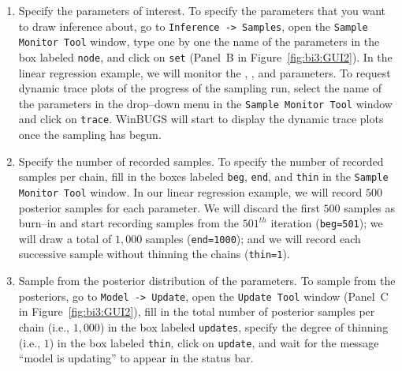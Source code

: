 \begin{enumerate}
\item Specify the parameters of interest. To specify the parameters that you want to draw inference about, go to \texttt{Inference -> Samples}, open the \texttt{Sample Monitor Tool} window, type one by one the name of the parameters in the box labeled \texttt{node}, and click on \texttt{set} (Panel~B in Figure~\ref{fig:bi3:GUI2}). In the linear regression example, we will monitor the , , and  parameters. To request dynamic trace plots of the progress of the sampling run, select the name of the parameters in the drop--down menu in the \texttt{Sample Monitor Tool} window and click on \texttt{trace}. WinBUGS will start to display the dynamic trace plots once the sampling has begun. 

\item Specify the number of recorded samples. To specify the number of recorded samples per chain, fill in the boxes labeled \texttt{beg}, \texttt{end}, and \texttt{thin} in the \texttt{Sample Monitor Tool} window. In our linear regression example, we will record $500$ posterior samples for each parameter. We will discard the first $500$ samples as burn--in and start recording samples from the $501^{th}$ iteration (\texttt{beg=501}); we will draw a total of $1,000$ samples (\texttt{end=1000}); and we will record each successive sample without thinning the chains (\texttt{thin=1}).

\item Sample from the posterior distribution of the parameters. To sample from the posteriors, go to \texttt{Model -> Update}, open the \texttt{Update Tool} window (Panel~C in Figure~\ref{fig:bi3:GUI2}), fill in the total number of posterior samples per chain (i.e., $1,000$) in the box labeled \texttt{updates}, specify the degree of thinning (i.e., $1$) in the box labeled \texttt{thin}, click on \texttt{update}, and wait for the message ``model is updating'' to appear in the status bar. 


\end{enumerate}
